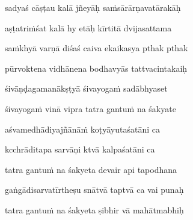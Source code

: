 sadyaś cāṣṭau kalā jñeyāḥ sa\.msārārṇavatārakāḥ\thinspace{\dandab} \dontdisplaylinenum

aṣṭatri\.mśat kalā hy etāḥ kīrtitā dvijasattama \veg\dontdisplaylinenum

sa\.mkhyā varṇā diśaś caiva ekaikasya pthak pthak\thinspace{\dandab} \dontdisplaylinenum

pūrvoktena vidhānena bodhavyās tattvacintakaiḥ \veg\dontdisplaylinenum

śivāṇḍagamanākṣṭyā śivayoga\.m sadābhyaset\thinspace{\dandab} \dontdisplaylinenum

śivayoga\.m vinā vipra tatra gantu\.m na śakyate \veg\dontdisplaylinenum

aśvamedhādiyajñānā\.m koṭyāyutaśatāni ca\thinspace{\dandab} \dontdisplaylinenum

kcchrāditapa sarvāṇi ktvā kalpaśatāni ca \danda\dontdisplaylinenum

tatra gantu\.m na śakyeta devair api tapodhana \veg\dontdisplaylinenum

gaṅgādisarvatīrtheṣu snātvā taptvā ca vai punaḥ\thinspace{\dandab} \dontdisplaylinenum

tatra gantu\.m na śakyeta ṣibhir vā mahātmabhiḥ \veg\dontdisplaylinenum

